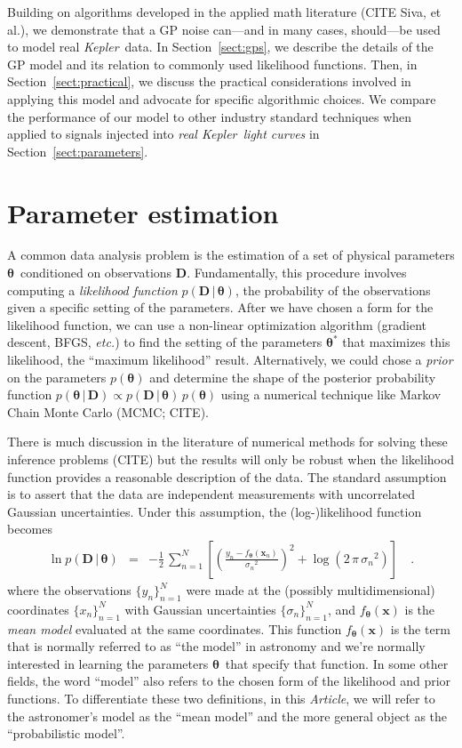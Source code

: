 \documentclass[12pt,preprint]{aastex}
\newcommand{\project}[1]{{\emph{#1}}}
\newcommand{\kepler}{\project{Kepler}}
\newcommand{\paper}{\emph{Article}}
\newcommand{\foreign}[1]{\emph{#1}}
\newcommand{\etc}{\foreign{etc.}}
\newcommand{\eqlabel}[1]{\label{eq:#1}}
\newcommand{\Sect}[1]{Section~\ref{sect:#1}}
\newcommand{\sect}[1]{\Sect{#1}}
\newcommand{\sectlabel}[1]{\label{sect:#1}}
\newcommand{\bvec}[1]{{\ensuremath{\boldsymbol{#1}}}}
\newcommand{\params}{{\ensuremath{\boldsymbol{\theta}}}}
\newcommand{\data}{{\ensuremath{\boldsymbol{D}}}}
\begin{document}
Building on algorithms developed in the applied math literature (CITE Siva, et
al.), we demonstrate that a GP noise can---and in many cases, should---be
used to model real \kepler\ data.
In \sect{gps}, we describe the details of the GP model and its relation to
commonly used likelihood functions.
Then, in \sect{practical}, we discuss the practical considerations involved in
applying this model and advocate for specific algorithmic choices.
We compare the performance of our model to other industry standard techniques
when applied to signals injected into \emph{real \kepler\ light curves} in
\sect{parameters}.

\section{Parameter estimation}
\sectlabel{parameter-est}

A common data analysis problem is the estimation of a set of physical
parameters \params\ conditioned on observations \data.
Fundamentally, this procedure involves computing a \emph{likelihood function}
$p(\data\,|\,\params)$, the probability of the observations given a specific
setting of the parameters.
After we have chosen a form for the likelihood function, we can use a
non-linear optimization algorithm (gradient descent, BFGS, \etc) to find the
setting of the parameters $\params^*$ that maximizes this likelihood, the
``maximum likelihood'' result.
Alternatively, we could chose a \emph{prior} on the parameters $p(\params)$
and determine the shape of the posterior probability function
$p(\params\,|\,\data) \propto p(\data\,|\,\params)\,p(\params)$ using a
numerical technique like Markov Chain Monte Carlo (MCMC; CITE).

There is much discussion in the literature of numerical methods for solving
these inference problems (CITE) but the results will only be robust when the
likelihood function provides a reasonable description of the data.
The standard assumption is to assert that the data are independent
measurements with uncorrelated Gaussian uncertainties.
Under this assumption, the (log-)likelihood function becomes
\begin{eqnarray}\eqlabel{gauss-lnlike}
\ln p (\data\,|\,\params) &=&
-\frac{1}{2} \, \sum_{n=1}^N \left [
    \left(\frac{y_n - f_\params(\bvec{x}_n)}{{\sigma_n}^2}\right)^2
    + \log (2\,\pi\,{\sigma_n}^2)\right ] \quad.
\end{eqnarray}
where the observations $\{y_n\}_{n=1}^N$ were made at the (possibly
multidimensional) coordinates $\{x_n\}_{n=1}^N$ with Gaussian uncertainties
$\{\sigma_n\}_{n=1}^N$, and $f_\params(\bvec{x})$ is the \emph{mean model}
evaluated at the same coordinates.
This function $f_\params(\bvec{x})$ is the term that is normally referred to
as ``the model'' in astronomy and we're normally interested in learning the
parameters \params\ that specify that function.
In some other fields, the word ``model'' also refers to the chosen form of the
likelihood and prior functions.
To differentiate these two definitions, in this \paper, we will refer to the
astronomer's model as the ``mean model'' and the more general object as the
``probabilistic model''.
\end{document}
